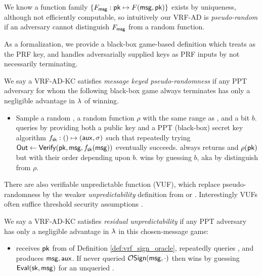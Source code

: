 We know a function family $\{ F_\mathsf{msg} : \mathsf{pk} \mapsto F(\mathsf{msg},\mathsf{pk}) \}$ exists
by uniqueness, although not efficiently computable, so intuitively
our VRF-AD is {\em pseudo-random} if an adversary cannot distinguish
$F_\mathsf{msg}$ from a random function.

As a formalization, we provide a black-box game-based definition which
treats \msg as the PRF key, and handles adversarially supplied keys as
PRF inputs by not necessarily terminating.

\begin{definition}
We say a VRF-AD-KC satisfies {\em message keyed pseudo-randomness} if 
any PPT adversary \adv for whom the following black-box game always
terminates has only a negligible advantage in $\lambda$ of winning.
\begin{itemize}
	\item[]
	Sample a random \msg, a random function $\rho$ with the same range as \Eval, and a bit $b$.
	\adv queries  by providing both a public key \pk and
	a PPT (black-box) secret key algorithm $f_\mathsf{sk} : () \mapsto (\mathsf{aux},\sigma)$
	such that repeatedly trying ${\mathsf{Out}} \leftarrow {\ensuremath{\mathsf{Verify}}}(\mathsf{pk},\mathsf{msg},f_\mathsf{sk}(\mathsf{msg}))$
	eventually succeeds.
	 always returns \Out and $\rho(\mathsf{pk})$ but with their order depending upon $b$.
	\adv wins by guessing $b$, aka by distinguish \Verify from $\rho$.
\end{itemize}
\end{definition}

There are also verifiable unpredictable function (VUF), which replace
pseudo-randomness by the weaker {\em unpredictability} definition from
\cite[Def. VUF (3) \S3.2, pp. 5]{vrf_micali} or \cite[Def. 4, pp. 8]{agg_dgk}.
Interestingly VUFs often suffice threshold security assumptions \cite{agg_dkg}.

\begin{definition}
We say a VRF-AD-KC satisfies {\em residual unpredictability} if 
any PPT adversary \adv has only a negligible advantage in $\lambda$
in this chosen-message game:
\begin{itemize}
	\item[]
	\adv receives $\mathsf{pk}$ from  of Definition \ref{def:vrf_sign_oracle},
    repeatedly queries , and produces $\mathsf{msg},\mathsf{aux}$.
    If \adv never queried $\mathcal{O}\mathsf{Sign}(\mathsf{msg},\cdot)$ then
    \adv wins by guessing ${\mathsf{Eval}}(\mathsf{sk},\mathsf{msg})$ for an unqueried \msg.
\end{itemize}
\end{definition}

